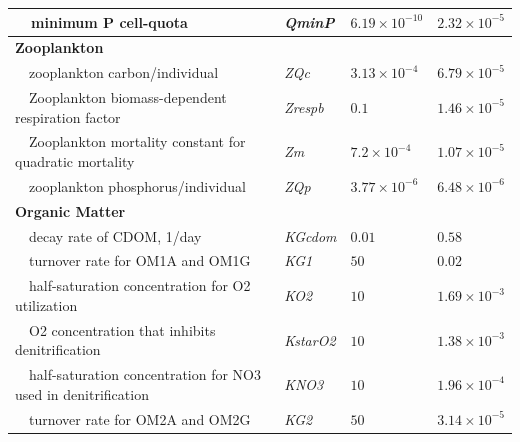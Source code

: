 \documentclass[letterpaper,12pt,oneside]{article}\usepackage[]{graphicx}\usepackage[]{color}
\begin{document}
\begin{table}[!tbp]
{\begin{center}
\begin{tabular}{llll}
~~minimum P cell-quota&\textit{QminP}&$6.19\times 10^{-10}$&$2.32\times 10^{-5}$\tabularnewline
\hline
{\bfseries Zooplankton}&&&\tabularnewline
~~zooplankton carbon/individual&\textit{ZQc}&$3.13\times 10^{-4}$&$6.79\times 10^{-5}$\tabularnewline
~~Zooplankton biomass-dependent respiration factor&\textit{Zrespb}&$0.1$&$1.46\times 10^{-5}$\tabularnewline
~~Zooplankton mortality constant for quadratic mortality&\textit{Zm}&$7.2\times 10^{-4}$&$1.07\times 10^{-5}$\tabularnewline
~~zooplankton phosphorus/individual&\textit{ZQp}&$3.77\times 10^{-6}$&$6.48\times 10^{-6}$\tabularnewline
\hline
{\bfseries Organic Matter}&&&\tabularnewline
~~decay rate of CDOM, 1/day&\textit{KGcdom}&$0.01$&$0.58$\tabularnewline
~~turnover rate for OM1A and OM1G&\textit{KG1}&$50$&$0.02$\tabularnewline
~~half-saturation concentration for O2 utilization&\textit{KO2}&$10$&$1.69\times 10^{-3}$\tabularnewline
~~O2 concentration that inhibits denitrification&\textit{KstarO2}&$10$&$1.38\times 10^{-3}$\tabularnewline
~~half-saturation concentration for NO3 used in denitrification&\textit{KNO3}&$10$&$1.96\times 10^{-4}$\tabularnewline
~~turnover rate for OM2A and OM2G&\textit{KG2}&$50$&$3.14\times 10^{-5}$\tabularnewline
\hline
\end{tabular}\end{center}}

\end{table}
\end{document}
